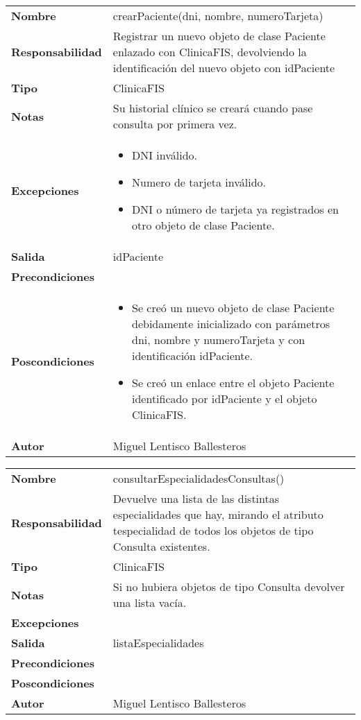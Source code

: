 \documentclass[11pt,a4paper]{article}
\newenvironment{itemizenomargins}
    {\begin{minipage}[t]{1\linewidth}\begin{itemize}}
    {\end{itemize}\end{minipage}}
\begin{document}
\begin{table}[H]
	\centering
	\label{my-label}
	\begin{tabularx}{\textwidth}{l|X}
		\textbf{Nombre}          & crearPaciente(dni, nombre, numeroTarjeta)\\
		\textbf{Responsabilidad} &  Registrar un nuevo objeto de clase Paciente enlazado con ClinicaFIS, devolviendo la identificación del nuevo objeto con idPaciente\\
		\textbf{Tipo}            & ClinicaFIS \\
		\textbf{Notas}           &  Su historial clínico se creará cuando pase consulta por primera vez. \\
		\textbf{Excepciones}     &  
			\begin{itemizenomargins}
				\item DNI inválido.
				\item Numero de tarjeta inválido.
				\item DNI o número de tarjeta ya registrados en otro objeto de clase Paciente.
			\end{itemizenomargins}		\\
		\textbf{Salida}          &  idPaciente \\
		\textbf{Precondiciones}  &  \\
		\textbf{Poscondiciones}  & 
			\begin{itemizenomargins}
				\item Se creó un nuevo objeto de clase Paciente debidamente inicializado con parámetros dni, nombre y numeroTarjeta y con identificación idPaciente.
				\item Se creó un enlace entre el objeto Paciente identificado por idPaciente y el objeto ClinicaFIS.
			\end{itemizenomargins} \\
		\textbf{Autor}			 & Miguel Lentisco Ballesteros
	\end{tabularx}
\end{table}

\begin{table}[H]
	\centering
	\label{my-label}
	\begin{tabularx}{\textwidth}{l|X}
		\textbf{Nombre}          & consultarEspecialidadesConsultas() \\
		\textbf{Responsabilidad} & Devuelve una lista de las distintas especialidades que hay, mirando el atributo tespecialidad de todos los objetos de tipo Consulta existentes.\\
		\textbf{Tipo}            & ClinicaFIS \\
		\textbf{Notas}           & Si no hubiera objetos de tipo Consulta devolver una lista vacía. \\
		\textbf{Excepciones}     &  \\
		\textbf{Salida}          &  listaEspecialidades \\
		\textbf{Precondiciones}  &  \\
		\textbf{Poscondiciones}  &  \\
		\textbf{Autor}			 & Miguel Lentisco Ballesteros
	\end{tabularx}
\end{table}
\end{document}
